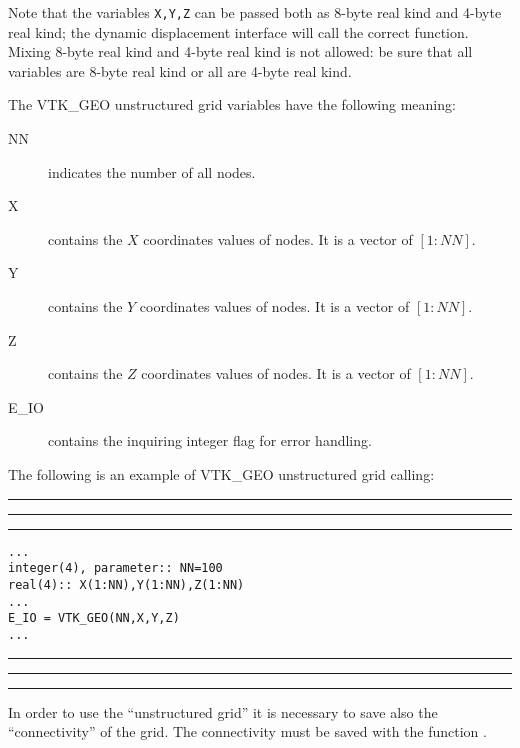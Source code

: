 \documentclass[pagesize=pdftex,fontsize=10pt,paper=a4,oneside]{scrbook}
\DeclareRobustCommand{\MarginNote}[1]{\marginpar{%
\slshape\footnotesize%
\parindent=0pt\lineskip=0pt\lineskiplimit=0pt%
\tolerance=2000\hyphenpenalty=300\exhyphenpenalty=300%
\doublehyphendemerits=100000\finalhyphendemerits=\doublehyphendemerits%
\raggedright\hspace{0pt}#1}}
\newenvironment{boxred}[1]%
               {%
                \noindent\hspace*{-0.025\textwidth}%
                \color{Maroon}%
                \rule[-5.8pt]{0.6pt}{6pt}\hspace*{-0.6pt}\rule{1.05\textwidth}{0.6pt}\hspace*{-0.6pt}\rule[-5.8pt]{0.6pt}{6pt}%
                \color{black}%
                \vspace*{0.6pt}\MarginNote{\color{Maroon}{#1}}%
               }%
               {%
                \noindent\hspace*{-0.025\textwidth}%
                \color{Maroon}%
                \rule[0pt]{0.6pt}{6pt}\hspace*{-0.6pt}\rule{1.05\textwidth}{0.6pt}\hspace*{-0.6pt}\rule[0pt]{0.6pt}{6pt}%
                \color{black}%
                \vspace*{2mm}%
               }
\newcommand{\virgo}[1]{``{#1}''}
\DeclareRobustCommand{\MaiuscolettoBS}[1]{\textls[80]{\scshape\MakeTextLowercase{#1}}}
\begin{document}
Note that the variables \texttt{X,Y,Z} can be passed both as 8-byte real kind and 4-byte real kind; the dynamic
displacement interface will call the correct function. Mixing 8-byte real kind and 4-byte real kind is not allowed: be
sure that all variables are 8-byte real kind or all are 4-byte real kind.

The VTK\_GEO unstructured grid variables have the following meaning:

\begin{description}
 \item[{\color{RoyalBlue}NN}] indicates the number of all nodes.
 \item[{\color{RoyalBlue}X}] contains the $X$ coordinates values of nodes. It is a vector of $[1:NN]$.
 \item[{\color{RoyalBlue}Y}] contains the $Y$ coordinates values of nodes. It is a vector of $[1:NN]$.
 \item[{\color{RoyalBlue}Z}] contains the $Z$ coordinates values of nodes. It is a vector of $[1:NN]$.
 \item[{\color{RoyalBlue}E\_IO}] contains the inquiring integer flag for error handling.
\end{description}

The following is an example of VTK\_GEO unstructured grid calling:

\begin{boxred}{VTK\_GEO Unstructured Grid Calling}
\begin{verbatim}
...
integer(4), parameter:: NN=100
real(4):: X(1:NN),Y(1:NN),Z(1:NN)
...
E_IO = VTK_GEO(NN,X,Y,Z)
...
\end{verbatim}
\end{boxred}

In order to use the \virgo{unstructured grid} it is necessary to save also the \virgo{connectivity} of the grid. The
connectivity must be saved with the function \MaiuscolettoBS{VTK\_CON}.
\end{document}
